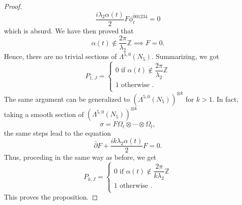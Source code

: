 \documentclass[10pt,a4paper]{amsart}
\newcommand{\delbar}{\bar{\partial}}
\begin{document}
\begin{proof}
	\[  \dfrac{i\lambda_{2}\alpha(t)}{2} F\phi_{t}^{\bar 0 01234} = 0  \]
	which is absurd. We have then proved that
	\[  \alpha(t) \notin  \dfrac{2\pi}{\lambda_{2}}\mathbb{Z} \implies F = 0. \]
	Hence, there are no trivial sections of $ \Lambda^{5,0}(N_{5}) $. Summarizing, we got
	\[ P_{1,J} = \begin{cases}
		0 \text{ if }  \alpha(t) \notin  \dfrac{2\pi}{\lambda_{2}}\mathbb{Z}  \\
		1 \text{ otherwise }. \\
	\end{cases} \]
	The same argument can be generalized to $( \Lambda^{5,0}(N_{5}) )^{\otimes k}$ for $ k > 1 $. In fact, taking a smooth section of $ ( \Lambda^{5,0}(N_{5}) )^{\otimes k} $
	\[ \sigma = F\Omega_{t} \otimes \cdots \otimes \Omega_{t},\]
	the same steps lead to the equation
	\[ \delbar F + \dfrac{ik\lambda_{2}\alpha(t)}{2}F = 0. \]
	Thus, proceding in the same way as before, we get
	\[ P_{k,J} = \begin{cases}
		0 \text{ if }  \alpha(t) \notin  \dfrac{2\pi}{k\lambda_{2}}\mathbb{Z} \\
		1 \text{ otherwise }. \\
	\end{cases}  \]
	This proves the proposition.
\end{proof}
\end{document}
